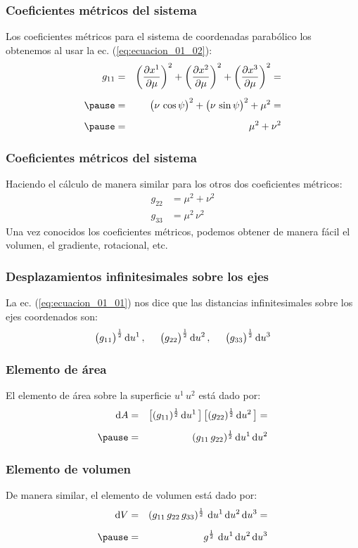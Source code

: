 \documentclass[12pt]{beamer}
\begin{document}
\begin{frame}
\frametitle{Coeficientes métricos del sistema}
Los coeficientes métricos para el sistema de coordenadas parabólico los obtenemos al usar la ec. (\ref{eq:ecuacion_01_02}):
\pause
\begin{eqnarray*}
g_{11} &=& \left( \pdv{x^{1}}{\mu} \right)^{2} + \left( \pdv{x^{2}}{\mu} \right)^{2} + \left( \pdv{x^{3}}{\mu} \right)^{2} = \\[0.5em] \pause
&=& \big( \nu \, \cos \psi \big)^{2} + \big( \nu \, \sin \psi \big)^{2} + \mu^{2} = \\[0.5em] \pause
&=& \mu^{2} + \nu^{2}
\end{eqnarray*}
\end{frame}
\begin{frame}
\frametitle{Coeficientes métricos del sistema}
Haciendo el cálculo de manera similar para los otros dos coeficientes métricos:
\begin{align*}
g_{22} &= \mu^{2} + \nu^{2} \\[0.5em]
g_{33} &= \mu^{2} \, \nu^{2}
\end{align*}
\pause
Una vez conocidos los coeficientes métricos, podemos obtener de manera fácil el volumen, el gradiente, rotacional, etc.
\end{frame}
\begin{frame}
\frametitle{Desplazamientos infinitesimales sobre los ejes}
La ec. (\ref{eq:ecuacion_01_01}) nos dice que las distancias infinitesimales sobre los ejes coordenados son:
\begin{align*}
\big( g_{11} \big)^{\frac{1}{2}} \dd{u^{1}}, \hspace{0.5cm} \big( g_{22} \big)^{\frac{1}{2}} \dd{u^{2}}, \hspace{0.5cm} \big( g_{33} \big)^{\frac{1}{2}} \dd{u^{3}}
\end{align*}
\end{frame}
\begin{frame}
\frametitle{Elemento de área}
El elemento de área sobre la superficie $u^{1} \, u^{2}$ está dado por:
\begin{eqnarray}
\dd{A} &=& \big[ (g_{11})^{\frac{1}{2}} \dd{u^{1}} \big] \, \big[ (g_{22})^{\frac{1}{2}} \dd{u^{2}} \big] = \nonumber \\[0.5em] \pause
&=& (g_{11} \, g_{22})^{\frac{1}{2}} \dd{u^{1}} \dd{u^{2}}
\label{ec:ecuacion_01_03}
\end{eqnarray}
\end{frame}
\begin{frame}
\frametitle{Elemento de volumen}
De manera similar, el elemento de volumen está dado por:
\begin{eqnarray}
\dd{V} &=& (g_{11} \, g_{22} \, g_{33})^{\frac{1}{2}} \, \dd{u^{1}} \dd{u^{2}} \dd{u^{3}} = \nonumber \\[0.5em] \pause
&=& g^{\frac{1}{2}} \, \dd{u^{1}} \dd{u^{2}} \dd{u^{3}} \label{eq:ecuacion_01_04}
\end{eqnarray}
\end{frame}
\end{document}
